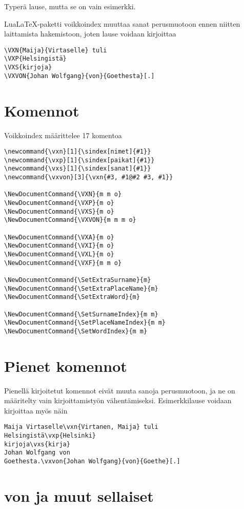 \documentclass[12pt]{article}
\begin{document}
Typerä lause, mutta se on vain esimerkki.

LuaLaTeX-paketti voikkoindex muuttaa sanat perusmuotoon ennen niitten
laittamista hakemistoon, joten lause voidaan kirjoittaa

\begin{verbatim}
\VXN{Maija}{Virtaselle} tuli
\VXP{Helsingistä}
\VXS{kirjoja}
\VXVON{Johan Wolfgang}{von}{Goethesta}[.]
\end{verbatim}


\section*{Komennot}

Voikkoindex määrittelee 17 komentoa

\begin{verbatim}
\newcommand{\vxn}[1]{\sindex[nimet]{#1}}
\newcommand{\vxp}[1]{\sindex[paikat]{#1}}
\newcommand{\vxs}[1]{\sindex[sanat]{#1}}
\newcommand{\vxvon}[3]{\vxn{#3, #1@#2 #3, #1}}

\NewDocumentCommand{\VXN}{m m o}
\NewDocumentCommand{\VXP}{m o}
\NewDocumentCommand{\VXS}{m o}
\NewDocumentCommand{\VXVON}{m m m o}

\NewDocumentCommand{\VXA}{m o}
\NewDocumentCommand{\VXI}{m o}
\NewDocumentCommand{\VXL}{m o}
\NewDocumentCommand{\VXF}{m m o}

\NewDocumentCommand{\SetExtraSurname}{m}
\NewDocumentCommand{\SetExtraPlaceName}{m}
\NewDocumentCommand{\SetExtraWord}{m}

\NewDocumentCommand{\SetSurnameIndex}{m m}
\NewDocumentCommand{\SetPlaceNameIndex}{m m}
\NewDocumentCommand{\SetWordIndex}{m m}
\end{verbatim}


\section*{Pienet komennot}

Pienellä kirjoitetut komennot eivät muuta sanoja perusmuotoon, ja ne
on määritelty vain kirjoittamistyön vähentämiseksi. Esimerkkilause
voidaan kirjoittaa myös näin

\begin{verbatim}
Maija Virtaselle\vxn{Virtanen, Maija} tuli
Helsingistä\vxp{Helsinki}
kirjoja\vxs{kirja}
Johan Wolfgang von
Goethesta.\vxvon{Johan Wolfgang}{von}{Goethe}[.]
\end{verbatim}


\section*{von ja muut sellaiset}
\end{document}
